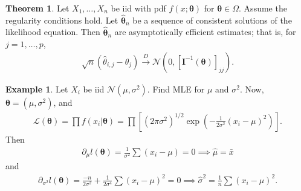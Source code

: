\documentclass{book}
\theoremstyle{definition}
\newtheorem{thm}{Theorem}[section]
\newtheorem{exmp}{Example}[section]
\newcommand{\p}{\partial}
\newcommand{\lag}{\mathcal{L}}
\newcommand{\N}{\mathcal{N}}
\newcommand{\f}[2]{\frac{#1}{#2}}
\newcommand{\lp}{\left(}
\newcommand{\rp}{\right)}
\newcommand{\lb}{\left[}
\newcommand{\rb}{\right]}
\begin{document}
\begin{thm}
	Let $X_1,\dots,X_n$ be iid with pdf $f(x;\bm\theta)$ for $\bm\theta \in \Omega$. Assume the regularity conditions hold. Let $\hat{\bm\theta}_n$ be a sequence of consistent solutions of the likelihood equation. Then $\hat{\bm\theta}_n$ are asymptotically efficient estimates; that is, for $j = 1,\dots,p$,
	\begin{align}
	\sqrt{n}(\hat\theta_{i,j} - \theta_j) \xrightarrow{D} \N(0, [\mathbf{I}^{-1}(\bm\theta)]_{jj}).
	\end{align}
\end{thm}




 





\begin{exmp}
	Let $X_i$ be iid $\N(\mu,\sigma^2)$. Find MLE for $\mu$ and $\sigma^2$. Now, $\bm{\theta} = (\mu,\sigma^2)$, and 
	\begin{align}
	\lag(\bm\theta) = \prod f(x_i\vert \bm\theta) = \prod \lb (2\pi \sigma^2)^{1/2} \exp\lp -\f{1}{2\sigma^2}(x_i - \mu)^2 \rp \rb.
	\end{align}
	Then
	\begin{align}
	\p_\mu l(\bm\theta) = \f{1}{\sigma^2}\sum(x_i - \mu) = 0 \implies \hat\mu = \bar{x}
	\end{align}
	and
	\begin{align}
	\p_{\sigma^2} l(\bm\theta) = \f{-n}{2\sigma^2} + \f{1}{2\sigma^4}\sum(x_i - \mu)^2 = 0\implies \hat\sigma^2 = \f{1}{n}\sum (x_i - \mu)^2.
	\end{align}
\end{exmp}
\end{document}
